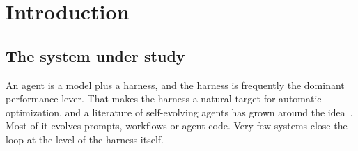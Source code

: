 \chapter{Introduction}
\label{ch:intro}


\section{The system under study}
\label{sec:motivation}

An agent is a model plus a harness, and the harness is frequently the
dominant performance lever. That makes the harness a natural target for
automatic optimization, and a literature of self-evolving agents has grown
around the idea~\cite{survey-selfevolve}. Most of it evolves prompts,
workflows or agent code. Very few systems close the loop at the level of
the harness itself.

